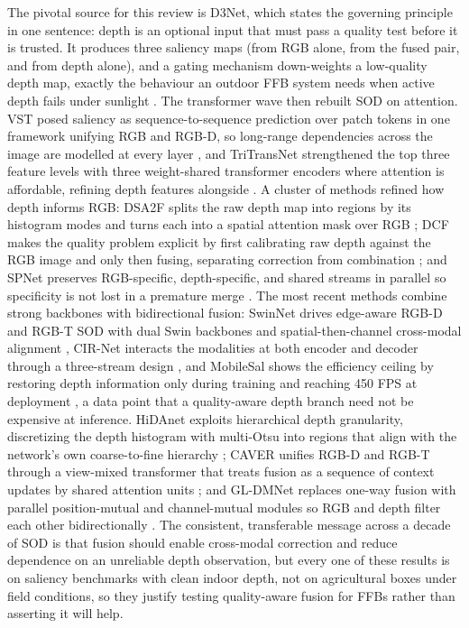 The pivotal source for this review is D3Net, which states the governing principle in one sentence: depth is an optional input that must pass a quality test before it is trusted. It produces three saliency maps (from RGB alone, from the fused pair, and from depth alone), and a gating mechanism down-weights a low-quality depth map, exactly the behaviour an outdoor FFB system needs when active depth fails under sunlight \cite{fan2020d3net}. The transformer wave then rebuilt SOD on attention. VST posed saliency as sequence-to-sequence prediction over patch tokens in one framework unifying RGB and RGB-D, so long-range dependencies across the image are modelled at every layer \cite{liu2021vst}, and TriTransNet strengthened the top three feature levels with three weight-shared transformer encoders where attention is affordable, refining depth features alongside \cite{liu2021tritransnet}. A cluster of methods refined how depth informs RGB: DSA2F splits the raw depth map into regions by its histogram modes and turns each into a spatial attention mask over RGB \cite{sun2021dsa2f}; DCF makes the quality problem explicit by first calibrating raw depth against the RGB image and only then fusing, separating correction from combination \cite{ji2021dcf}; and SPNet preserves RGB-specific, depth-specific, and shared streams in parallel so specificity is not lost in a premature merge \cite{zhou2021spnet}. The most recent methods combine strong backbones with bidirectional fusion: SwinNet drives edge-aware RGB-D and RGB-T SOD with dual Swin backbones and spatial-then-channel cross-modal alignment \cite{liu2021swinnet}, CIR-Net interacts the modalities at both encoder and decoder through a three-stream design \cite{cong2022cirnet}, and MobileSal shows the efficiency ceiling by restoring depth information only during training and reaching 450 FPS at deployment \cite{wu2022mobilesal}, a data point that a quality-aware depth branch need not be expensive at inference. HiDAnet exploits hierarchical depth granularity, discretizing the depth histogram with multi-Otsu into regions that align with the network's own coarse-to-fine hierarchy \cite{wu2023hidanet}; CAVER unifies RGB-D and RGB-T through a view-mixed transformer that treats fusion as a sequence of context updates by shared attention units \cite{pang2023caver}; and GL-DMNet replaces one-way fusion with parallel position-mutual and channel-mutual modules so RGB and depth filter each other bidirectionally \cite{yi2025gldmnet}. The consistent, transferable message across a decade of SOD is that fusion should enable cross-modal correction and reduce dependence on an unreliable depth observation, but every one of these results is on saliency benchmarks with clean indoor depth, not on agricultural boxes under field conditions, so they justify testing quality-aware fusion for FFBs rather than asserting it will help.

